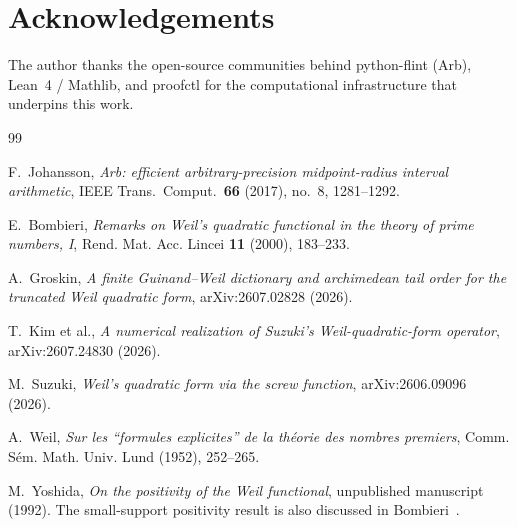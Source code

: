 \documentclass[12pt,a4paper]{amsart}
\theoremstyle{plain}
\theoremstyle{definition}
\begin{document}
\enlargethispage{2\baselineskip}
\section*{Acknowledgements}
The author thanks the open-source communities behind python-flint (Arb),
Lean~4 / Mathlib, and proofctl for the computational infrastructure
that underpins this work.

{\footnotesize\setlength{\itemsep}{1pt}\setlength{\parsep}{1pt}
\begin{thebibliography}{99}

F.~Johansson, \emph{Arb: efficient arbitrary-precision midpoint-radius interval
arithmetic}, IEEE Trans.\ Comput.\ \textbf{66} (2017), no.~8, 1281--1292.

E.~Bombieri, \emph{Remarks on Weil's quadratic functional in the theory of
prime numbers, I}, Rend. Mat. Acc. Lincei \textbf{11} (2000), 183--233.

A.~Groskin, \emph{A finite Guinand--Weil dictionary and archimedean tail order
for the truncated Weil quadratic form}, arXiv:2607.02828 (2026).

T.~Kim et al., \emph{A numerical realization of Suzuki's Weil-quadratic-form
operator}, arXiv:2607.24830 (2026).

M.~Suzuki, \emph{Weil's quadratic form via the screw function},
arXiv:2606.09096 (2026).

A.~Weil, \emph{Sur les ``formules explicites'' de la th\'eorie des nombres
premiers}, Comm. S\'em. Math. Univ. Lund (1952), 252--265.

M.~Yoshida, \emph{On the positivity of the Weil functional}, unpublished
manuscript (1992). The small-support positivity result is also discussed
in Bombieri~\cite{Bombieri2000}.

\end{thebibliography}
}
\end{document}

